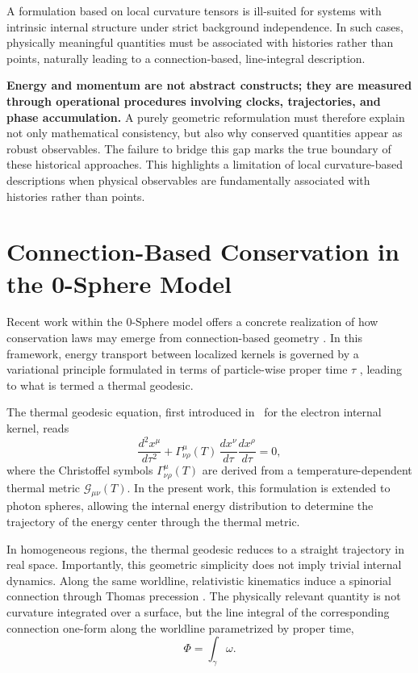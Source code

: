 \documentclass[%
 reprint,
 amsmath,amssymb,
 aps,
 prb,
]{revtex4-2}
\numberwithin{equation}{section}
\begin{document}
A formulation based on local curvature tensors is ill-suited for systems with intrinsic internal structure under strict background independence. In such cases, physically meaningful quantities must be associated with histories rather than points, naturally leading to a connection-based, line-integral description.

\textbf{Energy and momentum are not abstract constructs; they are measured through operational procedures involving clocks, trajectories, and phase accumulation.} A purely geometric reformulation must therefore explain not only mathematical consistency, but also why conserved quantities appear as robust observables. The failure to bridge this gap marks the true boundary of these historical approaches. This highlights a limitation of local curvature-based descriptions when physical observables are fundamentally associated with histories rather than points.

\section{Connection-Based Conservation in the 0-Sphere Model}
\label{sec:0sphere_conservation}

Recent work within the 0-Sphere model offers a concrete realization of how conservation laws may emerge from connection-based geometry \cite{hanamura18064535,hanamura17765017}. In this framework, energy transport between localized kernels is governed by a variational principle formulated in terms of particle-wise proper time $\tau$ \cite{Stueckelberg1941}, leading to what is termed a thermal geodesic.

The thermal geodesic equation, first introduced in~\cite{hanamura17765349} for the electron internal kernel, reads
\begin{equation}
\label{eq:thermal_geodesic}
\frac{d^2 x^\mu}{d\tau^2} + \Gamma^\mu_{\nu\rho}(T) \, \frac{dx^\nu}{d\tau} \frac{dx^\rho}{d\tau} = 0,
\end{equation}
where the Christoffel symbols $\Gamma^\mu_{\nu\rho}(T)$ are derived from a temperature-dependent thermal metric $\mathcal{G}_{\mu\nu}(T)$. In the present work, this formulation is extended to photon spheres, allowing the internal energy distribution to determine the trajectory of the energy center through the thermal metric.

In homogeneous regions, the thermal geodesic reduces to a straight trajectory in real space. Importantly, this geometric simplicity does not imply trivial internal dynamics. Along the same worldline, relativistic kinematics induce a spinorial connection through Thomas precession \cite{Thomas1926,Jackson}. The physically relevant quantity is not curvature integrated over a surface, but the line integral of the corresponding connection one-form along the worldline parametrized by proper time,
\begin{equation}
\Phi = \int_{\gamma} \omega .
\end{equation}
\end{document}
